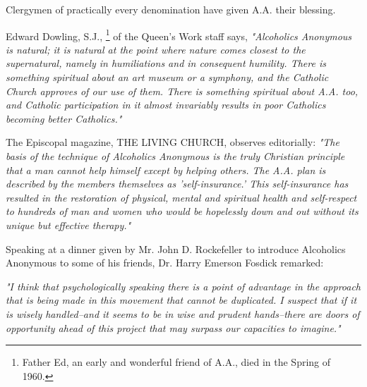 


\begin{biblechapter}
\verseWithHeading{}
    Clergymen of practically every denomination 
    have given A.A. their blessing.

    Edward Dowling, S.J.,
    \footnote[*]{Father Ed, an early and wonderful friend of A.A., died in the Spring of 1960.}
    of the Queen's Work staff says,
\verse\emph{ "Alcoholics Anonymous is natural; 
    it is natural at the point where nature 
    comes closest to the supernatural,
    namely in humiliations and in consequent humility.
\verse There is something spiritual about an art museum or a symphony, 
    and the Catholic Church approves of our use of them.
\verse There is something spiritual about A.A. too, 
    and Catholic participation in it almost invariably results 
    in poor Catholics becoming better Catholics."
}

    The Episcopal magazine, THE LIVING CHURCH, observes editorially: 
\verse\emph{ "The basis of the technique of Alcoholics Anonymous 
    is the truly Christian principle 
    that a man cannot help himself except by helping others.
    The A.A. plan is described by the members themselves as 
    'self-insurance.'
\verse This self-insurance has resulted in the restoration of 
    physical, mental and spiritual health 
    and self-respect to hundreds of man and women 
    who would be hopelessly down and out 
    without its unique but effective therapy."
}

    Speaking at a dinner given by Mr. John D. Rockefeller 
    to introduce Alcoholics Anonymous to some of his friends,
    Dr. Harry Emerson Fosdick remarked:

\verse\emph{"I think that psychologically speaking 
    there is a point of advantage 
    in the approach that is being made in this movement 
    that cannot be duplicated.
\verse I suspect that if it is wisely handled--and 
    it seems to be in wise and prudent hands--there 
    are doors of opportunity ahead of this project 
    that may surpass our capacities to imagine."
}


\end{biblechapter}
